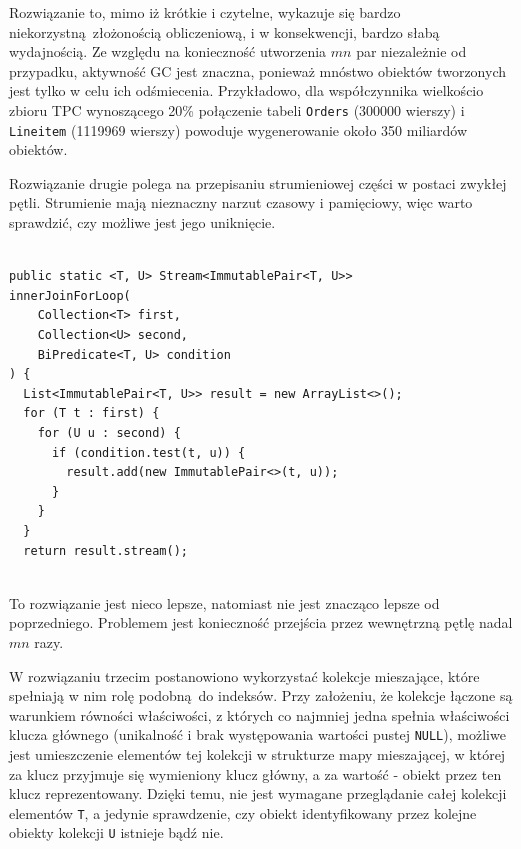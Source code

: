 \documentclass[12pt]{extarticle}
\begin{document}
    Rozwiązanie to, mimo iż krótkie i czytelne, wykazuje się bardzo niekorzystną złożonością obliczeniową, i w konsekwencji, bardzo słabą wydajnością. Ze względu na konieczność utworzenia $ mn $ par niezależnie od przypadku, aktywność GC jest znaczna, ponieważ mnóstwo obiektów tworzonych jest tylko w celu ich odśmiecenia. Przykładowo, dla współczynnika wielkościo zbioru TPC wynoszącego 20\% połączenie tabeli \texttt{Orders} (300000 wierszy) i \texttt{Lineitem} (1119969 wierszy) powoduje wygenerowanie około 350 miliardów obiektów.

    Rozwiązanie drugie polega na przepisaniu strumieniowej części w postaci zwykłej pętli. Strumienie mają nieznaczny narzut czasowy i pamięciowy, więc warto sprawdzić, czy możliwe jest jego uniknięcie.

\begin{lstlisting}[label=join2, caption=Rozwiązanie nr 2]

public static <T, U> Stream<ImmutablePair<T, U>>
innerJoinForLoop(
    Collection<T> first,
    Collection<U> second,
    BiPredicate<T, U> condition
) {
  List<ImmutablePair<T, U>> result = new ArrayList<>();
  for (T t : first) {
    for (U u : second) {
      if (condition.test(t, u)) {
        result.add(new ImmutablePair<>(t, u));
      }
    }
  }
  return result.stream();
    

\end{lstlisting}

    To rozwiązanie jest nieco lepsze, natomiast nie jest znacząco lepsze od poprzedniego. Problemem jest konieczność przejścia przez wewnętrzną pętlę nadal $ mn $ razy.

    W rozwiązaniu trzecim postanowiono wykorzystać kolekcje mieszające, które spełniają w nim rolę podobną do indeksów. Przy założeniu, że kolekcje łączone są warunkiem równości właściwości, z których co najmniej jedna spełnia właściwości klucza głównego (unikalność i brak występowania wartości pustej \texttt{NULL}), możliwe jest umieszczenie elementów tej kolekcji w strukturze mapy mieszającej, w której za klucz przyjmuje się wymieniony klucz główny, a za wartość - obiekt przez ten klucz reprezentowany. Dzięki temu, nie jest wymagane przeglądanie całej kolekcji elementów \texttt{T}, a jedynie sprawdzenie, czy obiekt identyfikowany przez kolejne obiekty kolekcji \texttt{U} istnieje bądź nie.
\end{document}

